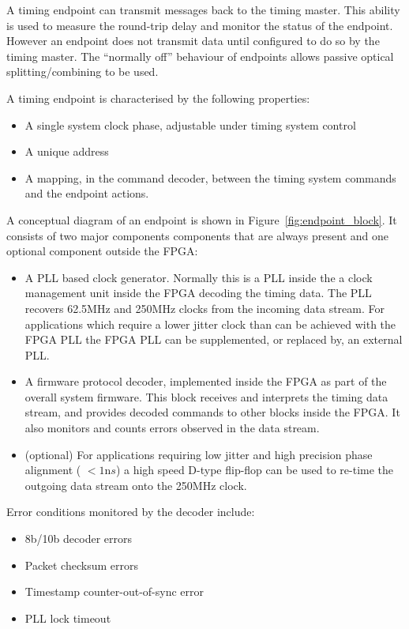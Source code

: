\documentclass{dune}
\begin{document}
A timing endpoint can transmit messages back to the timing master. This ability is used to measure the round-trip delay and monitor the status of the endpoint. However an endpoint does not transmit data until configured to do so by the timing master. The ``normally off'' behaviour of endpoints allows passive optical splitting/combining to be used. 

A timing endpoint is characterised by the following properties:

\begin{itemize}
	\item A single system clock phase, adjustable under timing system control
	\item A unique address
	\item A mapping, in the command decoder, between the timing system commands and the endpoint actions.
\end{itemize}

A conceptual diagram of an endpoint is shown in Figure~\ref{fig:endpoint_block}. It consists of two major components components that are always present and one optional component outside the FPGA:

\begin{itemize}
	\item A PLL based clock generator. Normally this is a PLL inside the a clock management unit inside the FPGA decoding the timing data. The PLL recovers 62.5MHz and 250MHz clocks from the incoming data stream. For applications which require a lower jitter clock than can be achieved with the FPGA PLL the FPGA PLL can be supplemented, or replaced by, an external PLL.
	\item A firmware protocol decoder, implemented inside the FPGA as part of the overall system firmware. This block receives and interprets the timing data stream, and provides decoded commands to other blocks inside the FPGA. It also monitors and counts errors observed in the data stream.
	\item(optional) For applications requiring low jitter and high precision phase alignment ( $< 1{\mathrm ns}$) a high speed D-type flip-flop can be used to re-time the outgoing data stream onto the 250MHz clock.
\end{itemize}

Error conditions monitored by the decoder include:

\begin{itemize}
	\item 8b/10b decoder errors
	\item Packet checksum errors
	\item Timestamp counter-out-of-sync error
	\item PLL lock timeout
\end{itemize}
\end{document}

